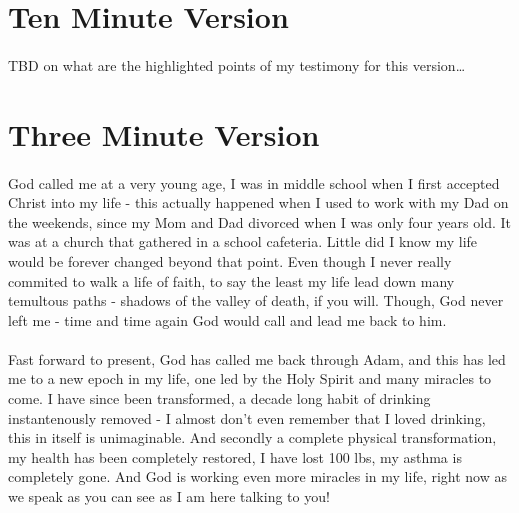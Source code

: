 \documentclass[a4paper]{article}
\begin{document}
\section{Ten Minute Version}
\label{sec:org6d80bfe}
\paragraph{}
TBD on what are the highlighted points of my testimony for this version\ldots{}


\section{Three Minute Version}
\label{sec:org9a4a506}
\paragraph{}
God called me at a very young age, I was in middle school when I first accepted Christ into my life - this
actually happened when I used to work with my Dad on the weekends, since my Mom and Dad divorced when I was
only four years old. It was at a church that gathered in a school cafeteria. Little did I know my life would
be forever changed beyond that point. Even though I never really commited to walk a life of faith, to say
the least my life lead down many temultous paths - shadows of the valley of death, if you will. Though, God
never left me - time and time again God would call and lead me back to him. 

\paragraph{}
Fast forward to present, God has called me back through Adam, and this has led me to a new epoch in my life,
one led by the Holy Spirit and many miracles to come. I have since been transformed, a decade long habit of
drinking instantenously removed - I almost don't even remember that I loved drinking, this in itself is
unimaginable. And secondly a complete physical transformation, my health has been completely restored, I
have lost 100 lbs, my asthma is completely gone. And God is working even more miracles in my life, right now
as we speak as you can see as I am here talking to you!
\end{document}

